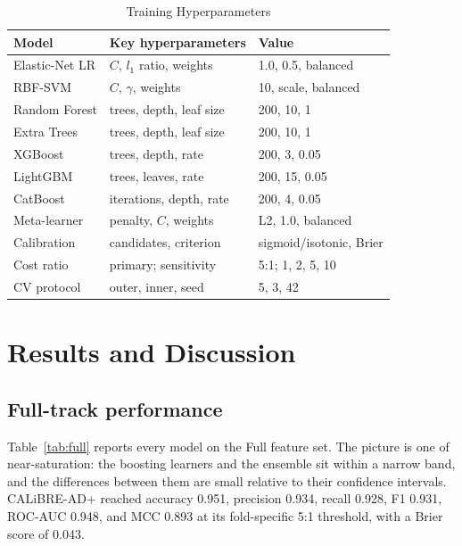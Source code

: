 \documentclass[conference]{IEEEtran}
\begin{document}
\begin{table}[!t]
\caption{Training Hyperparameters}
\label{tab:hyperparams}
\centering
\small
\begin{tabular}{@{}lll@{}}
\toprule
\textbf{Model} & \textbf{Key hyperparameters} & \textbf{Value} \\
\midrule
Elastic-Net LR & $C$, $l_1$ ratio, weights & 1.0, 0.5, balanced \\
RBF-SVM & $C$, $\gamma$, weights & 10, scale, balanced \\
Random Forest & trees, depth, leaf size & 200, 10, 1 \\
Extra Trees & trees, depth, leaf size & 200, 10, 1 \\
XGBoost & trees, depth, rate & 200, 3, 0.05 \\
LightGBM & trees, leaves, rate & 200, 15, 0.05 \\
CatBoost & iterations, depth, rate & 200, 4, 0.05 \\
Meta-learner & penalty, $C$, weights & L2, 1.0, balanced \\
Calibration & candidates, criterion & sigmoid/isotonic, Brier \\
Cost ratio & primary; sensitivity & 5:1; 1, 2, 5, 10 \\
CV protocol & outer, inner, seed & 5, 3, 42 \\
\bottomrule
\end{tabular}
\end{table}

\section{Results and Discussion}
\subsection{Full-track performance}
\label{sec:results-full}
Table~\ref{tab:full} reports every model on the Full feature set. The picture is one of near-saturation: the boosting learners and the ensemble sit within a narrow band, and the differences between them are small relative to their confidence intervals. CALiBRE-AD+ reached accuracy 0.951, precision 0.934, recall 0.928, F1 0.931, ROC-AUC 0.948, and MCC 0.893 at its fold-specific 5:1 threshold, with a Brier score of 0.043.
\end{document}
